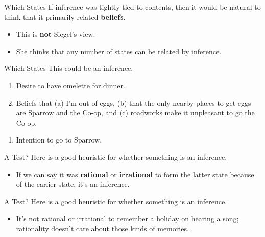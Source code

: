 \documentclass[
  17pt,
  letterpaper,
  ignorenonframetext,
  aspectratio=169,
  xcolor={dvipsnames}]{beamer}
\providecommand{\tightlist}{%
  \setlength{\itemsep}{0pt}\setlength{\parskip}{0pt}}\usepackage{longtable,booktabs,array}
\begin{document}
\begin{frame}{Which States}
\protect\hypertarget{which-states}{}
If inference was tightly tied to contents, then it would be natural to
think that it primarily related \textbf{beliefs}.

\begin{itemize}[<+->]
\tightlist
\item
  This is \textbf{not} Siegel's view.
\item
  She thinks that any number of states can be related by inference.
\end{itemize}
\end{frame}

\begin{frame}{Which States}
\protect\hypertarget{which-states-1}{}
This could be an inference.

\begin{enumerate}[<+->]
\tightlist
\item
  Desire to have omelette for dinner.
\item
  Beliefs that (a) I'm out of eggs, (b) that the only nearby places to
  get eggs are Sparrow and the Co-op, and (c) roadworks make it
  unpleasant to go the Co-op.
\end{enumerate}

\begin{enumerate}[<+->]
[A.]
\setcounter{enumi}{2}
\tightlist
\item
  Intention to go to Sparrow.
\end{enumerate}
\end{frame}

\begin{frame}{A Test?}
\protect\hypertarget{a-test}{}
Here is a good heuristic for whether something is an inference.

\begin{itemize}[<+->]
\tightlist
\item
  If we can say it was \textbf{rational} or \textbf{irrational} to form
  the latter state because of the earlier state, it's an inference.
\end{itemize}
\end{frame}

\begin{frame}{A Test?}
\protect\hypertarget{a-test-1}{}
Here is a good heuristic for whether something is an inference.

\begin{itemize}[<+->]
\tightlist
\item
  It's not rational or irrational to remember a holiday on hearing a
  song; rationality doesn't care about those kinds of memories.
\end{itemize}
\end{frame}
\end{document}
